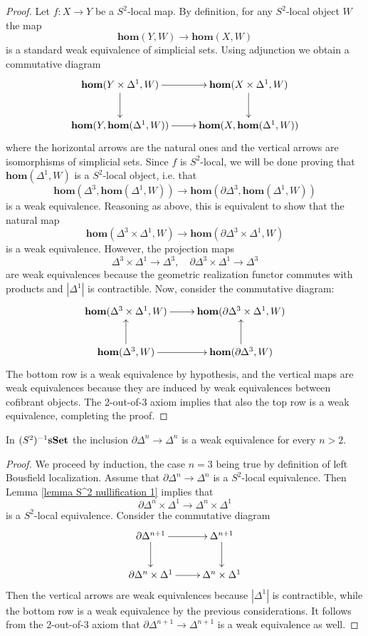 \begin{refsection}
\begin{proof}
Let $f \colon X \to Y$ be a $S^2$-local map. By definition, for any $S^2$-local object $W$ the map
\[
\mathbf{hom}(Y,W) \to \mathbf{hom}(X,W)
\]
is a standard weak equivalence of simplicial sets. Using adjunction we obtain a commutative diagram
\[
\xymatrix{
\mathbf{hom}(Y \times \Delta^1, W) \ar[d] \ar[r] & \mathbf{hom}(X \times \Delta^1, W) \ar[d] \\ \mathbf{hom}(Y, \mathbf{hom}(\Delta^1, W)) \ar[r] & \mathbf{hom}(X, \mathbf{hom}(\Delta^1,W))
}
\]
where the horizontal arrows are the natural ones and the vertical arrows are isomorphisms of simplicial sets. Since $f$ is $S^2$-local, we will be done proving that $\mathbf{hom}(\Delta^1,W)$ is a $S^2$-local object, i.e. that
\[
\mathbf{hom}(\Delta^3, \mathbf{hom}(\Delta^1, W)) \to \mathbf{hom}(\partial \Delta^3, \mathbf{hom}(\Delta^1, W))
\]
is a weak equivalence. Reasoning as above, this is equivalent to show that the natural map
\[
\mathbf{hom}(\Delta^3 \times \Delta^1, W) \to \mathbf{hom}(\partial \Delta^3 \times \Delta^1, W)
\]
is a weak equivalence. However, the projection maps
\[
\Delta^3 \times \Delta^1 \to \Delta^3, \quad \partial \Delta^3 \times \Delta^1 \to \Delta^3
\]
are weak equivalences because the geometric realization functor commutes with products and $|\Delta^1|$ is contractible. Now, consider the commutative diagram:
\[
\xymatrix{
\mathbf{hom}(\Delta^3 \times \Delta^1, W) \ar[r] & \mathbf{hom}(\partial \Delta^3 \times \Delta^1, W) \\ \mathbf{hom}(\Delta^3, W) \ar[u] \ar[r] & \mathbf{hom}(\partial \Delta^3, W) \ar[u]
}
\]
The bottom row is a weak equivalence by hypothesis, and the vertical maps are weak equivalences because they are induced by weak equivalences between cofibrant objects. The 2-out-of-3 axiom implies that also the top row is a weak equivalence, completing the proof.
\end{proof}

\begin{lemma} \label{lemma S^2 nullification 2}
In $(S^2)^{-1} \mathbf{sSet}$ the inclusion $\partial \Delta^n \to \Delta^n$ is a weak equivalence for every $n > 2$.
\end{lemma}

\begin{proof}
We proceed by induction, the case $n = 3$ being true by definition of left Bousfield localization. Assume that $\partial \Delta^n \to \Delta^n$ is a $S^2$-local equivalence. Then Lemma \ref{lemma S^2 nullification 1} implies that
\[
\partial \Delta^n \times \Delta^1 \to \Delta^n \times \Delta^1
\]
is a $S^2$-local equivalence. Consider the commutative diagram
\[
\xymatrix{
\partial \Delta^{n+1} \ar[r] \ar[d] & \Delta^{n+1} \ar[d] \\ \partial \Delta^n \times \Delta^1 \ar[r] & \Delta^n \times \Delta^1
}
\]
Then the vertical arrows are weak equivalences because $|\Delta^1|$ is contractible, while the bottom row is a weak equivalence by the previous considerations. It follows from the 2-out-of-3 axiom that $\partial \Delta^{n+1} \to \Delta^{n+1}$ is a weak equivalence as well.
\end{proof}


\end{refsection}
